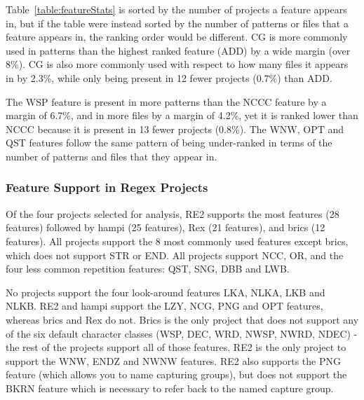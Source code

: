 
Table~\ref{table:featureStats} is sorted by the number of projects a feature appears in, but if the table were instead sorted by the number of patterns or files that a feature appears in, the ranking order would be different.  CG is more commonly used in patterns than the highest ranked feature (ADD) by a wide margin (over 8\%).  CG is also more commonly used with respect to how many files it appears in by 2.3\%, while only being present in 12 fewer projects (0.7\%) than ADD.

The WSP feature is present in more patterns than the NCCC feature by a margin of 6.7\%, and in more files by a margin of 4.2\%, yet it is ranked lower than NCCC because it is present in 13 fewer projects (0.8\%).
The WNW, OPT and QST features follow the same pattern of being under-ranked in terms of the number of patterns and files that they appear in.



\subsubsection{Feature Support in Regex Projects}
Of the four projects selected for analysis, RE2 supports the most features (28 features) followed by hampi (25 features),  Rex (21 features), and brics (12 features).  All projects support the 8 most commonly used features except brics, which does not support STR or END.  All projects support NCC, OR, and the four less common repetition features: QST, SNG, DBB and LWB.

No projects support the four look-around features LKA, NLKA, LKB and NLKB.  RE2 and hampi support the LZY, NCG, PNG and OPT features, whereas brics and Rex do not.  Brics is the only project that does not support any of the six default character classes (WSP, DEC, WRD, NWSP, NWRD, NDEC) - the rest of the projects support all of those features.  RE2 is the only project to support the WNW, ENDZ and NWNW features.  RE2 also supports the PNG feature (which allows you to name capturing groups), but does not support the BKRN feature which is necessary to refer back to the named capture group.

